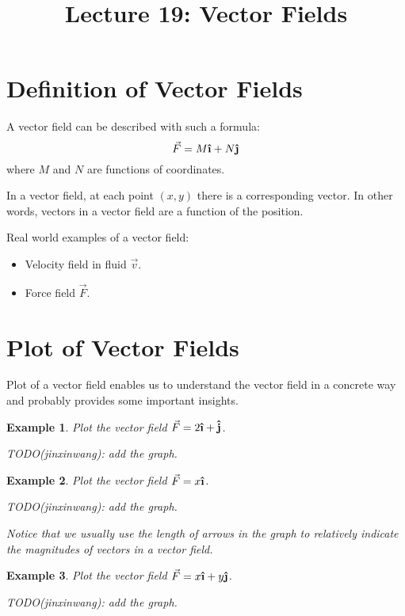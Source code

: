 \documentclass{article}
\title{Lecture 19: Vector Fields}
\author{}
\date{}
\newtheorem{example}{Example}
\newcommand{\uvec}[1]{\boldsymbol{\hat{\textbf{#1}}}}
\begin{document}
    
\maketitle

\section{Definition of Vector Fields}

A vector field can be described with such a formula:
\begin{equation*}
  \vec{F} = M \uvec{\i} + N \uvec{\j}
\end{equation*}
where $M$ and $N$ are functions of coordinates.

In a vector field, at each point $(x, y)$ there is a corresponding vector. In 
other words, vectors in a vector field are a function of the position.

Real world examples of a vector field:
\begin{itemize}
  \item Velocity field in fluid $\vec{v}$.
  \item Force field $\vec{F}$.
\end{itemize}

\section{Plot of Vector Fields}

Plot of a vector field enables us to understand the vector field in a concrete 
way and probably provides some important insights.

\begin{example}
  Plot the vector field $\vec{F} = 2 \uvec{\i} + \uvec{j}$.

  TODO(jinxinwang): add the graph.
\end{example}

\begin{example}
  Plot the vector field $\vec{F} = x \uvec{\i}$.

  TODO(jinxinwang): add the graph.

  Notice that we usually use the length of arrows in the graph to relatively 
  indicate the magnitudes of vectors in a vector field.
\end{example}

\begin{example}
  Plot the vector field $\vec{F} = x \uvec{\i} + y \uvec{\j}$.

  TODO(jinxinwang): add the graph.
\end{example}
\end{document}
